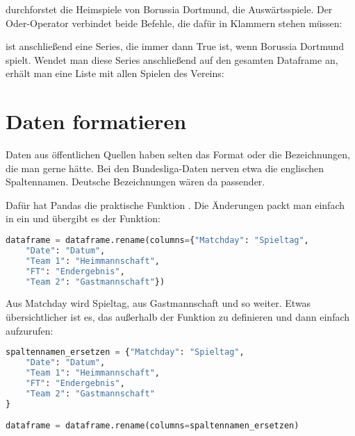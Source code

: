  durchforstet die Heimspiele von Borussia Dortmund,  die Auswärtsspiele. Der Oder-Operator \PYTHON{|} verbindet beide Befehle, die dafür in Klammern stehen müssen:

\medskip


\medskip


 ist anschließend eine Series, die immer dann True ist, wenn Borussia Dortmund spielt. Wendet man diese Series anschließend auf den gesamten Dataframe an, erhält man eine Liste mit allen Spielen des Vereins:

\medskip




\section{Daten formatieren}

Daten aus öffentlichen Quellen haben selten das Format oder die Bezeichnungen, die man gerne hätte. Bei den Bundesliga-Daten nerven etwa die englischen Spaltennamen. Deutsche Bezeichnungen wären da passender.

Dafür hat Pandas die praktische Funktion . Die Änderungen packt man einfach in ein  und übergibt es der Funktion:

\medskip

{\footnotesize
	\begin{lstlisting}[language=Python]
dataframe = dataframe.rename(columns={"Matchday": "Spieltag",
    "Date": "Datum",
    "Team 1": "Heimmannschaft",
    "FT": "Endergebnis",
    "Team 2": "Gastmannschaft"})
\end{lstlisting}
}

\medskip

Aus Matchday wird Spieltag, aus  Gastmannschaft und so weiter. Etwas übersichtlicher ist es, das  außerhalb der Funktion zu definieren und dann einfach aufzurufen:

\medskip

{\footnotesize
	\begin{lstlisting}[language=Python]
spaltennamen_ersetzen = {"Matchday": "Spieltag",
    "Date": "Datum",
    "Team 1": "Heimmannschaft",
    "FT": "Endergebnis",
    "Team 2": "Gastmannschaft"
}

dataframe = dataframe.rename(columns=spaltennamen_ersetzen)
\end{lstlisting}
}


